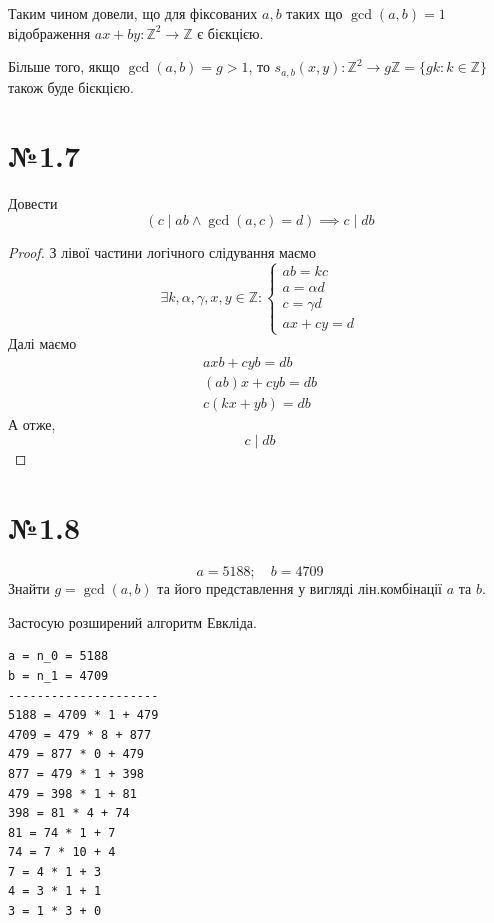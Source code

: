 \documentclass[11pt, a4paper]{article} %
\newcommand{\Z}{\mathbb{Z}}
\begin{document}
\begin{mdframed}
    Таким чином довели, що для фіксованих $a,b$ таких що $\gcd(a,b)=1$ \\
    відображення
    $ax+by : \Z^2 \to \Z$ є бієкцією.

    Більше того, якщо $\gcd(a,b)=g>1$, то $s_{a,b}(x,y):\Z^2 \to g\Z = \{gk : k\in \Z\}$ також буде бієкцією.
\end{mdframed}

\section*{№1.7}
\begin{mdframed}
    Довести 
    \[\left(c\mid ab \land \gcd(a,c)=d\right) \implies c\mid db\]
\end{mdframed}

\begin{proof}
    З лівої частини логічного слідування маємо
    \[\exists k,\alpha,\gamma,x,y\in\Z: 
    \begin{cases}
        ab = kc\\
        a=\alpha d\\
        c=\gamma d\\
        ax+cy=d
    \end{cases}
    \]
    Далі маємо
    \begin{gather*}
        axb+cyb=db\\
        (ab)x+cyb=db\\
        c(kx + yb)=db
    \end{gather*}
    А отже, \[c\mid db\]
\end{proof}

\newpage
\section*{№1.8}
\begin{mdframed}
    \[a = 5188;\quad b = 4709\]
    Знайти $g=\gcd(a,b)$ та його представлення у вигляді лін.комбінації $a$ та $b$.
\end{mdframed}

Застосую розширений алгоритм Евкліда.

\begin{lstlisting}
a = n_0 = 5188
b = n_1 = 4709
---------------------
5188 = 4709 * 1 + 479
4709 = 479 * 8 + 877
479 = 877 * 0 + 479
877 = 479 * 1 + 398
479 = 398 * 1 + 81
398 = 81 * 4 + 74
81 = 74 * 1 + 7
74 = 7 * 10 + 4
7 = 4 * 1 + 3
4 = 3 * 1 + 1
3 = 1 * 3 + 0
\end{lstlisting}
\end{document}
